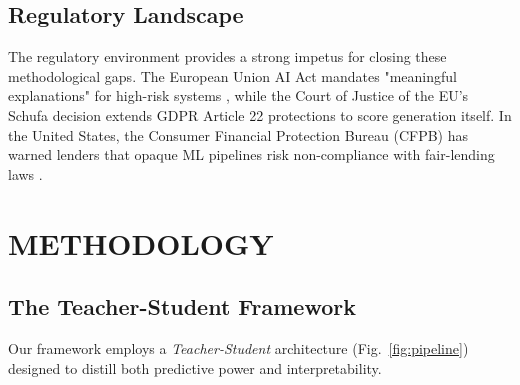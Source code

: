 \documentclass{wscpaperproc}
\theoremstyle{wsc}
\begin{document}
\subsection{Regulatory Landscape}
The regulatory environment provides a strong impetus for closing these methodological gaps. The European Union AI Act mandates "meaningful explanations" for high-risk systems \cite{Chee2024EULaw}, while the Court of Justice of the EU’s Schufa decision \cite{Hunton2023CJEU} extends GDPR Article 22 protections to score generation itself. In the United States, the Consumer Financial Protection Bureau (CFPB) has warned lenders that opaque ML pipelines risk non-compliance with fair-lending laws \cite{CFPBRisk2025FairLending}.


\section{METHODOLOGY}

\subsection{The Teacher-Student Framework}

Our framework employs a \textit{Teacher-Student} architecture (Fig.~\ref{fig:pipeline}) designed to distill both predictive power and interpretability.
\end{document}
